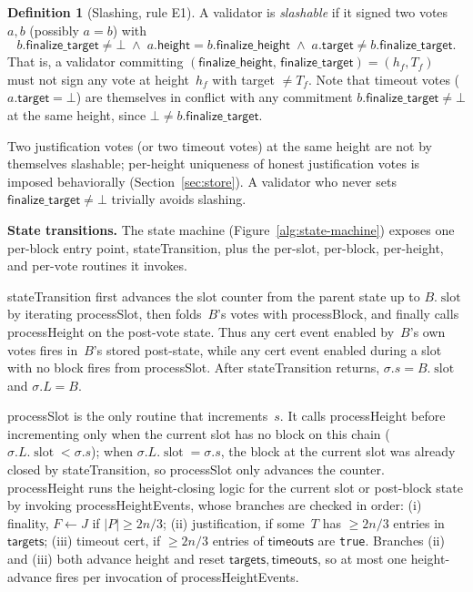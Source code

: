 \ifx\litemode\undefined\documentclass{article}\fi
\newcommand{\slot}[0]{\ensuremath{\operatorname{\mathrm{slot}}}}
\newcommand{\target}{\mathsf{target}}
\newcommand{\height}{\mathsf{height}}
\newcommand{\finalizeHeight}{\mathsf{finalize\_height}}
\newcommand{\finalizeTarget}{\mathsf{finalize\_target}}
\newcommand{\targets}{\mathsf{targets}}
\newcommand{\timeouts}{\mathsf{timeouts}}
\newcommand{\stateTransition}{\textsf{stateTransition}\xspace}
\newcommand{\processSlot}{\textsf{processSlot}\xspace}
\newcommand{\processBlock}{\textsf{processBlock}\xspace}
\newcommand{\processHeight}{\textsf{processHeight}\xspace}
\newcommand{\processHeightEvents}{\textsf{processHeightEvents}\xspace}
\renewcommand{\paragraph}[1]{\vspace{7pt}\noindent\textbf{#1}}
\theoremstyle{plain}
\theoremstyle{definition}
\newtheorem{definition}{Definition}
\theoremstyle{remark}
\begin{document}
\begin{definition}[Slashing, rule E1]\label{def:slashing}
A validator is \emph{slashable} if it signed two votes~$a, b$ (possibly $a = b$) with
\[
  b.\finalizeTarget \neq \bot \;\wedge\; a.\height = b.\finalizeHeight \;\wedge\; a.\target \neq b.\finalizeTarget.
\]
That is, a validator committing $(\finalizeHeight,\, \finalizeTarget) = (h_f, T_f)$ must not sign any vote at height~$h_f$ with target $\neq T_f$.
Note that timeout votes ($a.\target = \bot$) are themselves in conflict with any commitment $b.\finalizeTarget \neq \bot$ at the same height, since $\bot \neq b.\finalizeTarget$.
\end{definition}

Two justification votes (or two timeout votes) at the same height are not by themselves slashable; per-height uniqueness of honest justification votes is imposed behaviorally (Section~\ref{sec:store}).
A validator who never sets $\finalizeTarget \neq \bot$ trivially avoids slashing.

\paragraph{State transitions.}
The state machine (Figure~\ref{alg:state-machine}) exposes one per-block entry point, \stateTransition, plus the per-slot, per-block, per-height, and per-vote routines it invokes.

\stateTransition first advances the slot counter from the parent state up to $B.\slot$ by iterating \processSlot, then folds~$B$'s votes with \processBlock, and finally calls \processHeight on the post-vote state.
Thus any cert event enabled by~$B$'s own votes fires in~$B$'s stored post-state, while any cert event enabled during a slot with no block fires from \processSlot.
After \stateTransition{} returns, $\sigma.s = B.\slot$ and $\sigma.L = B$.

\processSlot is the only routine that increments~$s$.
It calls \processHeight before incrementing only when the current slot has no block on this chain ($\sigma.L.\slot < \sigma.s$); when $\sigma.L.\slot = \sigma.s$, the block at the current slot was already closed by \stateTransition, so \processSlot only advances the counter.
\processHeight runs the height-closing logic for the current slot or post-block state by invoking \processHeightEvents, whose branches are checked in order: (i) finality, $F \gets J$ if $|P| \geq 2n/3$; (ii) justification, if some~$T$ has $\geq 2n/3$ entries in $\targets$; (iii) timeout cert, if $\geq 2n/3$ entries of $\timeouts$ are \texttt{true}.
Branches (ii) and (iii) both advance height and reset $\targets, \timeouts$, so at most one height-advance fires per invocation of \processHeightEvents.
\end{document}
